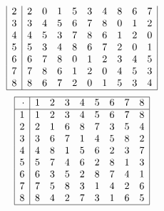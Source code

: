 \documentclass[12pt]{article}
\begin{document}
{$$\begin{array}{|r|*{9}{r}|}
         2&         2&         0&         1&         5&         3&         4&         8&         6&         7\\
         3&         3&         4&         5&         6&         7&         8&         0&         1&         2\\
         4&         4&         5&         3&         7&         8&         6&         1&         2&         0\\
         5&         5&         3&         4&         8&         6&         7&         2&         0&         1\\
         6&         6&         7&         8&         0&         1&         2&         3&         4&         5\\
         7&         7&         8&         6&         1&         2&         0&         4&         5&         3\\
         8&         8&         6&         7&         2&         0&         1&         5&         3&         4\\
\hline
\end{array}
$$
$$
\begin{array}{|r|*{8}{r}|}
\hline
\cdot  &         1 &         2 &         3 &         4 &         5 &         6 &         7 &         8\\
\hline
         1&         1&         2&         3&         4&         5&         6&         7&         8\\
         2&         2&         1&         6&         8&         7&         3&         5&         4\\
         3&         3&         6&         7&         1&         4&         5&         8&         2\\
         4&         4&         8&         1&         5&         6&         2&         3&         7\\
         5&         5&         7&         4&         6&         2&         8&         1&         3\\
         6&         6&         3&         5&         2&         8&         7&         4&         1\\
         7&         7&         5&         8&         3&         1&         4&         2&         6\\
         8&         8&         4&         2&         7&         3&         1&         6&         5\\
\hline
\end{array}
$$
}
\end{document}
